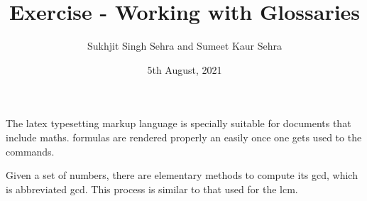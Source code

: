 \documentclass[11pt,a4paper]{article}
\title{Exercise - Working with Glossaries}
\author{Sukhjit Singh Sehra and Sumeet Kaur Sehra}
\date{5th August, 2021}
\begin{document}
%
\maketitle
%
The \Gls{latex} typesetting markup language is specially suitable 
for documents that include \gls{maths}. \Glspl{formula} are 
rendered properly an easily once one gets used to the commands.
 
Given a set of numbers, there are elementary methods to compute 
its \acrlong{gcd}, which is abbreviated \acrshort{gcd}. This 
process is similar to that used for the \acrfull{lcm}.
%
\printglossary[title=Abbrevations, toctitle=List of terms,type=\acronymtype]
\printglossary
\end{document}
